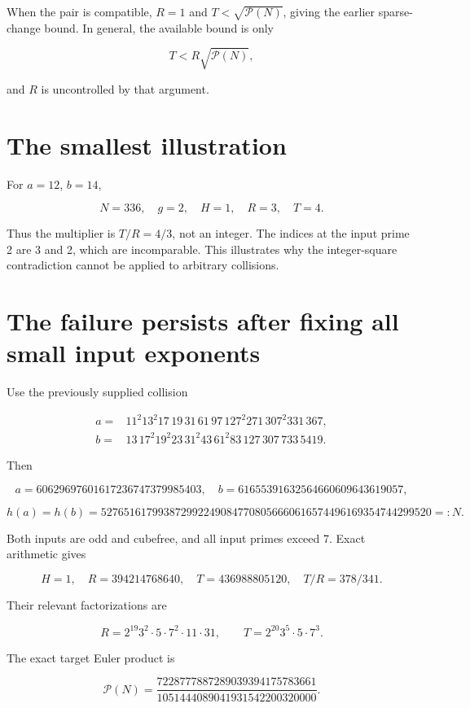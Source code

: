 When the pair is compatible, \(R=1\) and \(T<\sqrt{\mathcal P(N)}\), giving the earlier sparse-change bound. In general, the available bound is only

\[
T<R\sqrt{\mathcal P(N)},
\]

and \(R\) is uncontrolled by that argument.

\section{The smallest illustration}\label{ratio:the-smallest-illustration}

For \(a=12\), \(b=14\),

\[
N=336,\quad g=2,\quad H=1,\quad R=3,\quad T=4.
\]

Thus the multiplier is \(T/R=4/3\), not an integer. The indices at the input prime 2 are 3 and 2, which are incomparable. This illustrates why the integer-square contradiction cannot be applied to arbitrary collisions.

\section{The failure persists after fixing all small input exponents}\label{ratio:the-failure-persists-after-fixing-all-small-input-exponents}

Use the previously supplied collision

\[
\begin{aligned}
a={}&11^2 13^2 17\,19\,31\,61\,97\,127^2 271\,307^2 331\,367,\\
b={}&13\,17^2 19^2 23\,31^2 43\,61^2 83\,127\,307\,733\,5419.
\end{aligned}
\]

Then

\[
a=60629697601617236747379985403,
\quad b=61655391632564660609643619057,
\]

\[
h(a)=h(b)=
5276516179938729922490847708056660616574496169354744299520=:N.
\]

Both inputs are odd and cubefree, and all input primes exceed 7. Exact arithmetic gives

\[
H=1,\quad
R=394214768640,\quad T=436988805120,\quad
\boxed{T/R=378/341.}
\]

Their relevant factorizations are

\[
R=2^{19}3^2\cdot5\cdot7^2\cdot11\cdot31,
\qquad
T=2^{20}3^5\cdot5\cdot7^3.
\]

The exact target Euler product is

\[
\mathcal P(N)=
\frac{7228777887289039394175783661}
     {1051444089041931542200320000}.
\]

